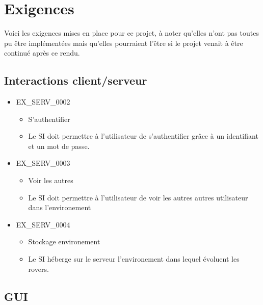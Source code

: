 \documentclass[12pt,a4paper]{scrartcl}
\begin{document}
\section{Exigences}
Voici les exigences mises en place pour ce projet, à noter qu'elles n'ont pas toutes pu être implémentées
mais qu'elles pourraient l'être si le projet venait à être continué après ce rendu.

\subsection{Interactions client/serveur}

\begin{itemize}

\item EX\_SERV\_0002
\begin{itemize}
\item S'authentifier
\item Le SI doit permettre à l'utilisateur de s'authentifier grâce à un
		identifiant et un mot de passe.
\end{itemize}


\item EX\_SERV\_0003
\begin{itemize}
\item Voir les autres
\item Le SI doit permettre à l'utilisateur de voir les autres autres 
	utilisateur dans l'environement
\end{itemize}

\item EX\_SERV\_0004
\begin{itemize}
\item Stockage environement
\item Le SI héberge sur le serveur l'environement dans lequel évoluent les 
	rovers.
\end{itemize}


\end{itemize}

\subsection{GUI}
\end{document}
